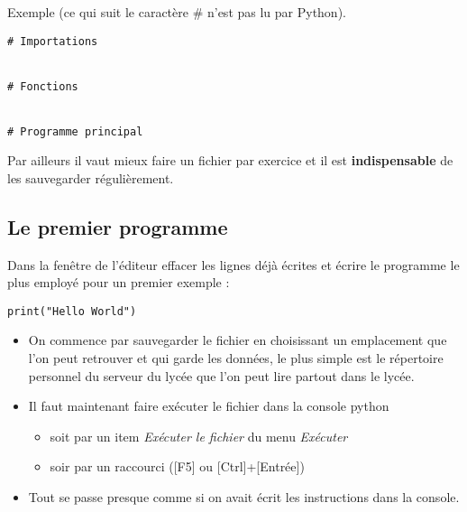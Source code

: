 Exemple (ce qui suit le caractère \# n'est pas lu par Python).

\begin{lstlisting}
# Importations


# Fonctions


# Programme principal
\end{lstlisting}

Par ailleurs il vaut mieux faire un fichier par exercice et il est \textbf{indispensable} de les sauvegarder régulièrement.
\subsection{Le premier programme}
Dans la fenêtre de l'éditeur effacer les lignes déjà écrites et écrire le programme le plus employé pour un premier exemple :

\begin{lstlisting}
print("Hello World")
\end{lstlisting}
\begin{itemize}
\item On commence par sauvegarder le fichier en choisissant un emplacement que l'on peut retrouver et qui garde les données, le plus simple est le répertoire personnel du serveur du lycée que l'on peut lire partout dans le lycée.

\item Il faut maintenant faire exécuter le fichier dans la console python

\begin{itemize}
\item soit par un item  \textit{Exécuter le fichier} du menu \textit{Exécuter}

\item soir par un raccourci ([F5] ou [Ctrl]+[Entrée])
\end{itemize}


\item Tout se passe presque comme si on avait écrit les instructions dans la console.

\end{itemize}
\begin{center}
\end{center}
